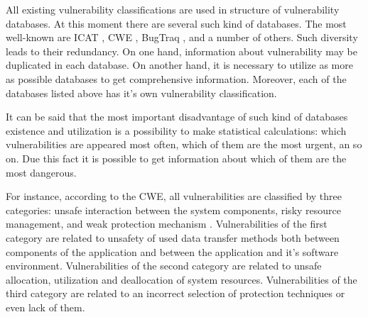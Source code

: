 

%
All existing vulnerability classifications are used in structure of vulnerability databases. 
%
At this moment there are several such kind of databases. 
%
The most well-known are ICAT , CWE , BugTraq , and a number of others. 
%
Such diversity leads to their redundancy. 
%
On one hand, information about vulnerability may be duplicated in each database. 
%
On another hand, it is necessary to utilize as more as possible databases to get comprehensive information. 
%
Moreover, each of the databases listed above has it's own vulnerability classification. 

%
It can be said that the most important disadvantage of such kind of databases existence and utilization is a possibility to make statistical calculations: which vulnerabilities are appeared most often, which of them are the most urgent, an so on. 
%
Due this fact it is possible to get information about which of them are the most dangerous. 

%
For instance, according to the CWE, all vulnerabilities are classified by three categories: unsafe interaction between the system components, risky resource management, and weak protection mechanism . 
%
Vulnerabilities of the first category are related to unsafety of used data transfer methods both between components of the application and between the application and it's software environment. 
%
Vulnerabilities of the second category are related to unsafe allocation, utilization and deallocation of system resources. 
%
Vulnerabilities of the third category are related to an incorrect selection of protection techniques or even lack of them. 